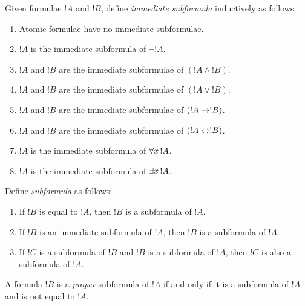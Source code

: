 \documentclass[open-logic-section]{subfiles}
\begin{document}
\begin{defn}
Given formulae $!A$ and $!B$, define \emph{immediate subformula}
inductively as follows:
\begin{enumerate}
\item Atomic formulae have no immediate subformulae.
\item $!A$ is the immediate subformula of $\lnot !A$.
\item $!A$ and $!B$ are the immediate subformulae of $(!A \land !B)$.
\item $!A$ and $!B$ are the immediate subformulae of $(!A \lor !B)$.
\item $!A$ and $!B$ are the immediate subformulae of $(!A \to !B)$.
\item $!A$ and $!B$ are the immediate subformulae of $(!A \leftrightarrow !B)$.
\item $!A$ is the immediate subformula of $\lforall[x][!A]$.
\item $!A$ is the immediate subformula of $\lexists[x][!A]$.
\end{enumerate}
\end{defn}


\begin{defn}[Subformula]
Define \emph{subformula} as follows:
\begin{enumerate}
\item If $!B$ is equal to $!A$, then $!B$ is a subformula of $!A$.
\item If $!B$ is an immediate subformula of $!A$, then $!B$ is a
  subformula of $!A$.
\item If $!C$ is a subformula of $!B$ and $!B$ is a subformula of
  $!A$, then $!C$ is also a subformula of $!A$.
\end{enumerate}
A formula $!B$ is a \emph{proper} subformula of $!A$ if and only if it
is a subformula of $!A$ and is not equal to $!A$.
\end{defn}

\end{document}
